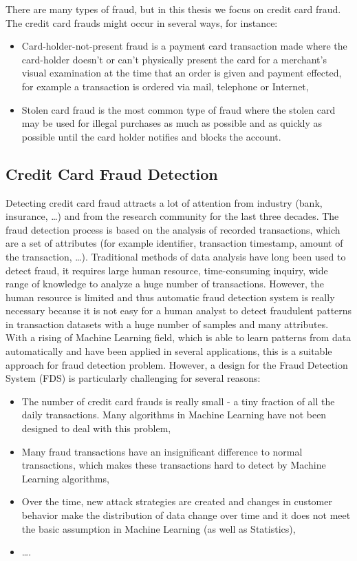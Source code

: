 There are many types of fraud, but in this thesis we focus on credit card fraud. The credit card frauds might occur in several ways, for instance:

\begin{itemize}
\item Card-holder-not-present fraud is a payment card transaction made where the card-holder doesn't or can't physically present the card for a merchant's visual examination at the time that an order is given and payment effected, for example a transaction is ordered via mail, telephone or Internet,
\item Stolen card fraud is the most common type of fraud where the stolen card may be used for illegal purchases as much as possible and as quickly as possible until the card holder notifies and blocks the account.
\end{itemize}


\subsection{Credit Card Fraud Detection}

Detecting credit card fraud attracts a lot of attention from industry (bank, insurance, \dots) and from the research community for the last three decades. The fraud detection process is based on the analysis of recorded transactions, which are a set of attributes (for example identifier, transaction timestamp, amount of the transaction, \dots). Traditional methods of data analysis have long been used to detect fraud, it requires large human resource, time-consuming inquiry, wide range of knowledge to analyze a huge number of transactions. However, the human resource is limited and thus automatic fraud detection system is really necessary because it is not easy for a human analyst to detect fraudulent patterns in transaction datasets with a huge number of samples and many attributes. With a rising of Machine Learning field, which is able to learn patterns from data automatically and have been applied in several applications, this is a suitable approach for fraud detection problem. However, a design for the Fraud Detection System (FDS) is particularly challenging for several reasons:

\begin{itemize}
\item The number of credit card frauds is really small - a tiny fraction of all the daily transactions. Many algorithms in Machine Learning have not been designed to deal with this problem,
\item Many fraud transactions have an insignificant difference to normal transactions, which makes these transactions hard to detect by Machine Learning algorithms,
\item Over the time, new attack strategies are created and changes in customer behavior make the distribution of data change over time and it does not meet the basic assumption in Machine Learning (as well as Statistics),
\item \dots.
\end{itemize}


